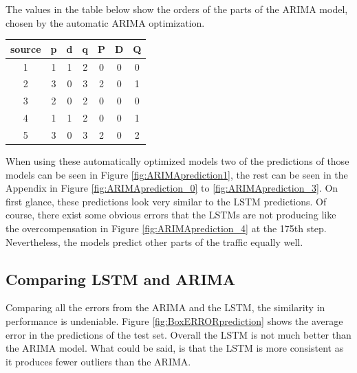 The values in the table below show the orders of the parts of the ARIMA model, chosen by the automatic ARIMA optimization.    

\begin{center}
	\begin{tabular}{|c|c|c|c|c|c|c|}
		\hline 
		source & p & d & q & P & D & Q \\ 
		\hline 
		1 & 1 & 1 & 2 & 0 & 0 & 0 \\ 
		\hline 
		2 & 3 & 0 & 3 & 2 & 0 & 1 \\ 
		\hline 
		3 & 2 & 0 & 2 & 0 & 0 & 0 \\ 
		\hline 
		4 & 1 & 1 & 2 & 0 & 0 & 1 \\ 
		\hline 
		5 & 3 & 0 & 3 & 2 & 0 & 2 \\ 
		\hline 
	\end{tabular}
\end{center}

When using these automatically optimized models two of the predictions of those models can be seen in Figure \ref{fig:ARIMAprediction1}, the rest can be seen in the Appendix in Figure \ref{fig:ARIMAprediction_0} to \ref{fig:ARIMAprediction_3}.
On first glance, these predictions look very similar to the LSTM predictions.
Of course, there exist some obvious errors that the LSTMs are not producing like the overcompensation in Figure \ref{fig:ARIMAprediction_4} at the 175th step.
Nevertheless, the models predict other parts of the traffic equally well.

\subsection{Comparing LSTM and ARIMA}    
Comparing all the errors from the ARIMA and the LSTM, the similarity in performance is undeniable.
Figure \ref{fig:BoxERRORprediction} shows the average error in the predictions of the test set.
Overall the LSTM is not much better than the ARIMA model.
What could be said, is that the LSTM is more consistent as it produces fewer outliers than the ARIMA.

